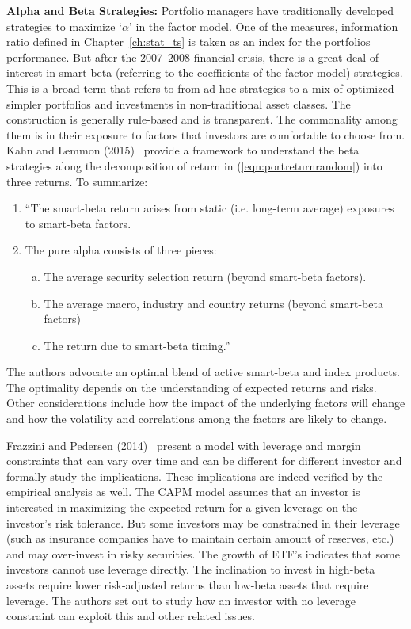 \noindent\textbf{Alpha and Beta Strategies:} Portfolio managers have traditionally developed strategies to maximize `$\alpha$' in the factor model. One of the measures, information ratio defined in Chapter~\ref{ch:stat_ts} is taken as an index for the portfolios performance. But after the 2007--2008 financial crisis, there is a great deal of interest in smart-beta (referring to the coefficients of the factor model) strategies. This is a broad term that refers to from ad-hoc strategies to a mix of optimized simpler portfolios and investments in non-traditional asset classes. The construction is generally rule-based and is transparent. The commonality among them is in their exposure to factors that investors are comfortable to choose from. Kahn and Lemmon (2015)~\cite{lemmon} provide a framework to understand the beta strategies along the decomposition of return in (\ref{eqn:portreturnrandom}) into three returns. To summarize:
	\begin{enumerate}[--]
	\item ``The smart-beta return arises from static (i.e. long-term average) exposures to smart-beta factors.
	\item The pure alpha consists of three pieces:
		\begin{enumerate}[a.]
		\item The average security selection return (beyond smart-beta factors).
		\item The average macro, industry and country returns (beyond smart-beta factors)
		\item The return due to smart-beta timing.''
		\end{enumerate}
	\end{enumerate}
The authors advocate an optimal blend of active smart-beta and index products. The optimality depends on the understanding of expected returns and risks. Other considerations include how the impact of the underlying factors will change and how the volatility and correlations among the factors are likely to change. 


Frazzini and Pedersen (2014)~\cite{frazped} present a model with leverage and margin constraints that can vary over time and can be different for different investor and formally study the implications. These implications are indeed verified by the empirical analysis as well. The CAPM model assumes that an investor is interested in maximizing the expected return for a given leverage on the investor's risk tolerance. But some investors may be constrained in their leverage (such as insurance companies have to maintain certain amount of reserves, etc.) and may over-invest in risky securities. The growth of ETF's indicates that some investors cannot use leverage directly. The inclination to invest in high-beta assets require lower risk-adjusted returns than low-beta assets that require leverage. The authors set out to study how an investor with no leverage constraint can exploit this and other related issues. 


